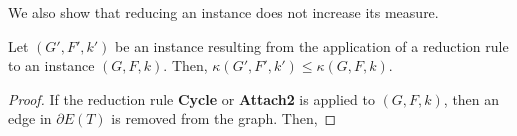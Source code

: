 \documentclass{llncs}
\newcommand{\longversion}[1]{#1}
\begin{document}
We also show that reducing an instance does not increase its measure.
\begin{lemma}
 Let $(G',F',k')$ be an instance resulting from the application of a reduction rule to an instance $(G,F,k)$. Then, $\kappa(G',F',k') \le \kappa(G,F,k)$.
\end{lemma}
\longversion{
\begin{proof}
 If the reduction rule \textbf{Cycle} or \textbf{Attach2} is applied to $(G,F,k)$, then an edge in $\partial E(T)$ is removed from the graph. Then,   
                                                                                                                                                      
                                                                                                                                                      
                                                                                                                                                      
                                                                                                                                                      
                                                                                                                                                      
                                                                                                                                                      
                                                                                                                                                      
                                                                                                                                                      
                                                                                                                                                      
                                                                                                                                                      
                                                                                                                                                      
                                                                                                                                                      
                                                                                                                                                      

\end{proof}}
\end{document}
